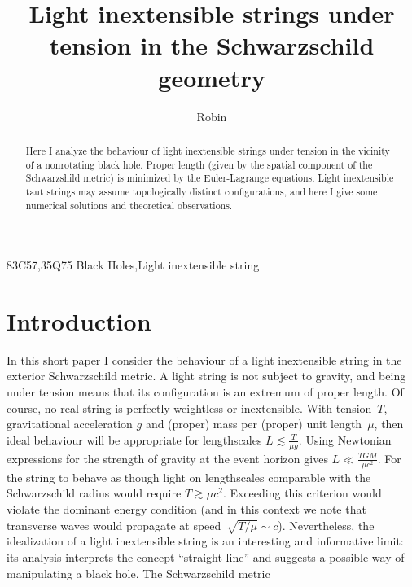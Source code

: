 \documentclass[times,twocolumn,final]{elsarticle}
\begin{document}

\begin{frontmatter}

\title{Light inextensible strings under tension in the Schwarzschild geometry}

\author[1]{Robin }

\address[1]{Auckland University of Technology, 2-14 Wakefield Street,
  Auckland 1142, New Zealand}




\begin{abstract}
Here I analyze the behaviour of light inextensible strings under
tension in the vicinity of a nonrotating black hole.  Proper length
(given by the spatial component of the Schwarzshild metric) is
minimized by the Euler-Lagrange equations.  Light inextensible taut
strings may assume topologically distinct configurations, and here I
give some numerical solutions and theoretical observations.
\end{abstract}

\begin{keyword}
\MSC 83C57\sep 35Q75
\KWD Black Holes\sep Light inextensible string
\end{keyword}

\end{frontmatter}


\section{Introduction}
\label{intro}
In this short paper I consider the behaviour of a light inextensible
string in the exterior Schwarzschild metric.  A light string is not
subject to gravity, and being under tension means that its
configuration is an extremum of proper length.  Of course, no real
string is perfectly weightless or inextensible.  With tension~$T$,
gravitational acceleration $g$ and (proper) mass per (proper) unit
length~$\mu$, then ideal behaviour will be appropriate for
lengthscales $L\lesssim\frac{T}{\mu g}$.  Using Newtonian expressions
for the strength of gravity at the event horizon gives
$L\ll\frac{TGM}{\mu c^2}$.  For the string to behave as though light
on lengthscales comparable with the Schwarzschild radius would require
$T\gtrsim\mu c^2$.  Exceeding this criterion would violate the
dominant energy condition (and in this context we note that transverse
waves would propagate at speed~$\sqrt{T/\mu}\sim c$).  Nevertheless,
the idealization of a light inextensible string is an interesting and
informative limit: its analysis interprets the concept ``straight
line'' and suggests a possible way of manipulating a black hole.  The
Schwarzschild metric
\end{document}
